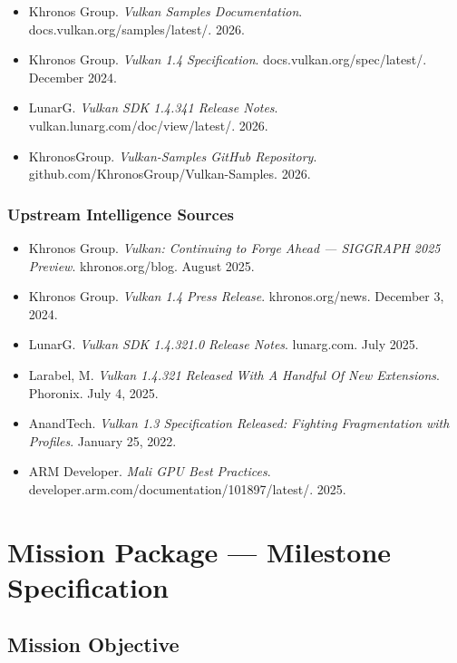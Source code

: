 \documentclass[11pt,letterpaper]{article}
\newcommand{\stageheader}[2]{%
  \noindent\colorbox{#2}{\makebox[\textwidth][l]{%
    \textcolor{white}{\bfseries\sffamily\hspace{6pt}#1\hspace{6pt}}}}%
  \vspace{0.5em}\par%
}
\begin{document}
\begin{itemize}[noitemsep]
  \item Khronos Group. \textit{Vulkan Samples Documentation}. docs.vulkan.org/samples/latest/. 2026.
  \item Khronos Group. \textit{Vulkan 1.4 Specification}. docs.vulkan.org/spec/latest/. December 2024.
  \item LunarG. \textit{Vulkan SDK 1.4.341 Release Notes}. vulkan.lunarg.com/doc/view/latest/. 2026.
  \item KhronosGroup. \textit{Vulkan-Samples GitHub Repository}. github.com/KhronosGroup/Vulkan-Samples. 2026.
\end{itemize}

\subsubsection{Upstream Intelligence Sources}

\begin{itemize}[noitemsep]
  \item Khronos Group. \textit{Vulkan: Continuing to Forge Ahead --- SIGGRAPH 2025 Preview}. khronos.org/blog. August 2025.
  \item Khronos Group. \textit{Vulkan 1.4 Press Release}. khronos.org/news. December 3, 2024.
  \item LunarG. \textit{Vulkan SDK 1.4.321.0 Release Notes}. lunarg.com. July 2025.
  \item Larabel, M. \textit{Vulkan 1.4.321 Released With A Handful Of New Extensions}. Phoronix. July 4, 2025.
  \item AnandTech. \textit{Vulkan 1.3 Specification Released: Fighting Fragmentation with Profiles}. January 25, 2022.
  \item ARM Developer. \textit{Mali GPU Best Practices}. developer.arm.com/documentation/101897/latest/. 2025.
\end{itemize}

\newpage
\stageheader{STAGE 3 --- MISSION PACKAGE}{tertiary}

\section{Mission Package --- Milestone Specification}

\subsection{Mission Objective}
\end{document}
